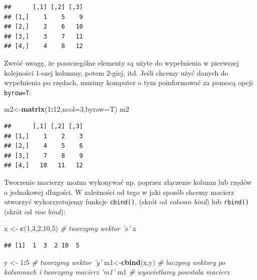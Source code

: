 \documentclass[]{book}
\newenvironment{Shaded}{\begin{snugshade}}{\end{snugshade}}
\newcommand{\KeywordTok}[1]{\textcolor[rgb]{0.13,0.29,0.53}{\textbf{#1}}}
\newcommand{\DataTypeTok}[1]{\textcolor[rgb]{0.13,0.29,0.53}{#1}}
\newcommand{\DecValTok}[1]{\textcolor[rgb]{0.00,0.00,0.81}{#1}}
\newcommand{\StringTok}[1]{\textcolor[rgb]{0.31,0.60,0.02}{#1}}
\newcommand{\CommentTok}[1]{\textcolor[rgb]{0.56,0.35,0.01}{\textit{#1}}}
\newcommand{\OperatorTok}[1]{\textcolor[rgb]{0.81,0.36,0.00}{\textbf{#1}}}
\newcommand{\NormalTok}[1]{#1}
\theoremstyle{definition}
\theoremstyle{definition}
\theoremstyle{definition}
\theoremstyle{remark}
\begin{document}
\begin{verbatim}
##      [,1] [,2] [,3]
## [1,]    1    5    9
## [2,]    2    6   10
## [3,]    3    7   11
## [4,]    4    8   12
\end{verbatim}

Zwróć uwagę, że poszczególne elementy są użyte do wypełnienia w
pierwszej kolejności 1-szej kolumny, potem 2-giej, itd. Jeśli chcemy
użyć danych do wypełnienia po rzędach, musimy komputer o tym
poinformować za pomocą opcji \texttt{byrow=T}:

\begin{Shaded}
\begin{Highlighting}[]
\NormalTok{m2<-}\KeywordTok{matrix}\NormalTok{(}\DecValTok{1}\OperatorTok{:}\DecValTok{12}\NormalTok{,}\DataTypeTok{ncol=}\DecValTok{3}\NormalTok{,}\DataTypeTok{byrow=}\NormalTok{T)}
\NormalTok{m2 }
\end{Highlighting}
\end{Shaded}

\begin{verbatim}
##      [,1] [,2] [,3]
## [1,]    1    2    3
## [2,]    4    5    6
## [3,]    7    8    9
## [4,]   10   11   12
\end{verbatim}

Tworzenie macierzy można wykonywać np. poprzez złączenie kolumn lub
rzędów o jednakowej długości. W zależności od tego w jaki sposób chcemy
macierz utworzyć wykorzystujemy funkcje \texttt{cbind()}, (skrót od
\emph{column bind}) lub \texttt{rbind()} (skrót od \emph{row bind}):

\begin{Shaded}
\begin{Highlighting}[]
\NormalTok{x <-}\StringTok{ }\KeywordTok{c}\NormalTok{(}\DecValTok{1}\NormalTok{,}\DecValTok{3}\NormalTok{,}\DecValTok{2}\NormalTok{,}\DecValTok{10}\NormalTok{,}\DecValTok{5}\NormalTok{) }\CommentTok{# tworzymy wektor 'x'}
\NormalTok{x}
\end{Highlighting}
\end{Shaded}

\begin{verbatim}
## [1]  1  3  2 10  5
\end{verbatim}

\begin{Shaded}
\begin{Highlighting}[]
\NormalTok{y <-}\StringTok{ }\DecValTok{1}\OperatorTok{:}\DecValTok{5} \CommentTok{# tworzymy wektor 'y'}
\NormalTok{m1<-}\KeywordTok{cbind}\NormalTok{(x,y) }\CommentTok{# laczymy wektory po kolumnach i tworzymy macierz 'm1'}
\NormalTok{m1 }\CommentTok{# wyswietlamy powstala macierz}
\end{Highlighting}
\end{Shaded}
\end{document}
